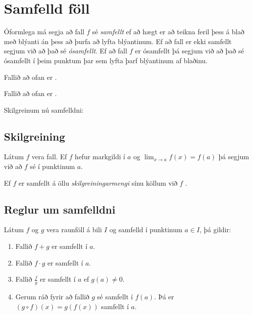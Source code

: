 \documentclass[a4paper,10pt,icelandic]{sphinxmanual}
\begin{document}
\section{Samfelld föll}
\label{\detokenize{Kafli10:samfelld-foll}}
Óformlega má segja að fall \(f\) sé \textit{samfellt} ef að hægt er að teikna feril þess á blað með blýanti án þess að þurfa að lyfta blýantinum. Ef að fall er ekki samfellt segjum við að það sé \textit{ósamfellt}.
Ef að fall \(f\) er ósamfellt þá segjum við að það sé ósamfellt í þeim punktum þar sem lyfta þarf blýantinum af blaðinu.

\begin{figure}[htbp]
\centering

\noindent{}
\end{figure}

Fallið að ofan er .

\begin{figure}[htbp]
\centering

\noindent{}
\end{figure}

Fallið að ofan er .

Skilgreinum nú samfelldni:


\subsection{Skilgreining}
\label{\detokenize{Kafli10:id1}}
Látum \(f\) vera fall. Ef \(f\) hefur markgildi í \(a\) og \(\lim_{x \to a} f(x)=f(a)\) þá segjum við að \(f\) sé  í punktinum \(a\).

Ef \(f\) er samfellt á öllu \textit{skilgreiningarmengi} sínu köllum við \(f\) .


\subsection{Reglur um samfelldni}
\label{\detokenize{Kafli10:reglur-um-samfelldni}}
Látum \(f\) og \(g\) vera raunföll á bili \(I\) og samfelld í punktinum \(a \in I\), þá gildir:
\begin{enumerate}
%
\item {} 
Fallið \(f+g\) er samfellt í \(a\).

\item {} 
Fallið \(f \cdot g\) er samfellt í \(a\).

\item {} 
Fallið \(\frac{f}{g}\) er samfellt í \(a\) ef \(g(a) \neq 0\).

\item {} 
Gerum ráð fyrir að fallið \(g\) sé samfellt í \(f(a)\). Þá er \((g \circ f)(x)=g(f(x))\) samfellt í \(a\).

\end{enumerate}
\end{document}
